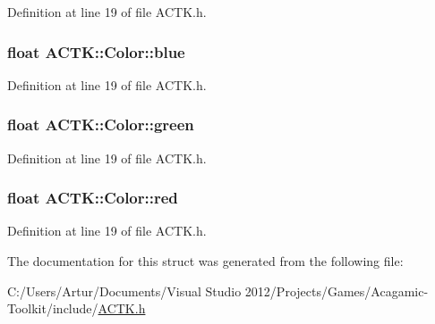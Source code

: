 Definition at line 19 of file A\-C\-T\-K.\-h.

\hypertarget{struct_a_c_t_k_1_1_color_a3e84d1d17f5134ba37967e4468ff50f9}{
\subsubsection[{blue}]{\setlength{\rightskip}{0pt plus 5cm}float A\-C\-T\-K\-::\-Color\-::blue}}\label{struct_a_c_t_k_1_1_color_a3e84d1d17f5134ba37967e4468ff50f9}


Definition at line 19 of file A\-C\-T\-K.\-h.

\hypertarget{struct_a_c_t_k_1_1_color_a83d16d56659a205b37a1320b506cfb9c}{
\subsubsection[{green}]{\setlength{\rightskip}{0pt plus 5cm}float A\-C\-T\-K\-::\-Color\-::green}}\label{struct_a_c_t_k_1_1_color_a83d16d56659a205b37a1320b506cfb9c}


Definition at line 19 of file A\-C\-T\-K.\-h.

\hypertarget{struct_a_c_t_k_1_1_color_aa1800ef627fccd35c2c4e33042fc5781}{
\subsubsection[{red}]{\setlength{\rightskip}{0pt plus 5cm}float A\-C\-T\-K\-::\-Color\-::red}}\label{struct_a_c_t_k_1_1_color_aa1800ef627fccd35c2c4e33042fc5781}


Definition at line 19 of file A\-C\-T\-K.\-h.



The documentation for this struct was generated from the following file\-:\begin{DoxyCompactItemize}
\item 
C\-:/\-Users/\-Artur/\-Documents/\-Visual Studio 2012/\-Projects/\-Games/\-Acagamic-\/\-Toolkit/include/\hyperlink{_a_c_t_k_8h}{A\-C\-T\-K.\-h}\end{DoxyCompactItemize}
